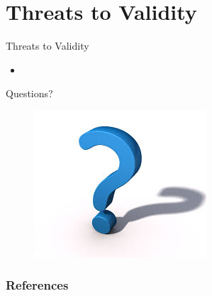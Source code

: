 \documentclass[t,14pt,mathserif]{beamer}
\begin{document}
\section{Threats to Validity}
\begin{frame}{Threats to Validity}
	\begin{itemize}
	    \item 
	
	\end{itemize}

\end{frame}




\begin{frame}{Questions?}

	\begin{figure}[hbtp]
		\centering
	\includegraphics[scale=1]{../img/questions.jpg}
	\end{figure}
	

\end{frame}


\begin{frame}[allowframebreaks]
   \frametitle{References}
   
   
\end{frame}
\end{document}
